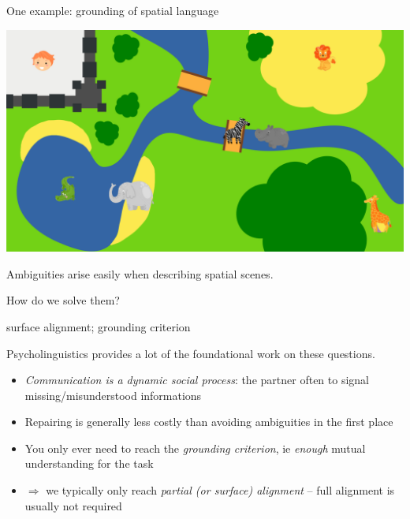 \documentclass[xcolor=table]{beamer}
\begin{document}
\begin{frame}{One example: grounding of spatial language}


    \begin{center}
        \includegraphics[width=0.9\linewidth]{ambiguous-desc/RefMap}

    Ambiguities arise easily when describing spatial scenes.

    How do we solve them?

    \end{center}

\end{frame}






{
\begin{frame}{surface alignment; grounding criterion}

    Psycholinguistics provides a lot of the foundational work on these
    questions.

    \begin{itemize}
        \item<+-> \emph{Communication is a dynamic social process}: the partner often to signal
            missing/misunderstood informations
        \item<+-> Repairing is generally less costly than avoiding ambiguities in
            the first place
        \item<+-> You only ever need to reach the \emph{grounding criterion}, ie
            \emph{enough} mutual understanding for the task
        \item<+-> $\Rightarrow$ we typically only reach \emph{partial (or surface)
            alignment} -- full alignment is usually not required
    \end{itemize}
\end{frame}
}
\end{document}
